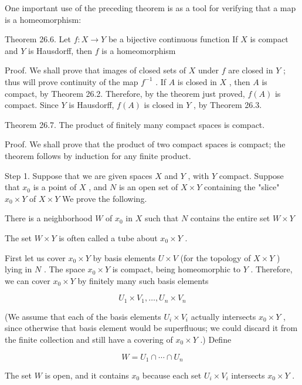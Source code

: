 \documentclass[10pt]{article}
\begin{document}
One important use of the preceding theorem is as a tool for verifying that a map is a homeomorphism:

Theorem 26.6. Let \(f : X \rightarrow  Y\) be a bijective continuous function If \(X\) is compact and \(Y\) is Hausdorff, then \(f\) is a homeomorphism

Proof. We shall prove that images of closed sets of \(X\) under \(f\) are closed in \(Y\) ; thus will prove continuity of the map \({f}^{-1}\) . If \(A\) is closed in \(X\) , then \(A\) is compact, by Theorem 26.2. Therefore, by the theorem just proved, \(f\left( A\right)\) is compact. Since \(Y\) is Hausdorff, \(f\left( A\right)\) is closed in \(Y\) , by Theorem 26.3.

Theorem 26.7. The product of finitely many compact spaces is compact.

Proof. We shall prove that the product of two compact spaces is compact; the theorem follows by induction for any finite product.

Step 1. Suppose that we are given spaces \(X\) and \(Y\) , with \(Y\) compact. Suppose that \({x}_{0}\) is a point of \(X\) , and \(N\) is an open set of \(X \times  Y\) containing the "slice" \({x}_{0} \times  Y\) of \(X \times  Y\) We prove the following.

There is a neighborhood \(W\) of \({x}_{0}\) in \(X\) such that \(N\) contains the entire set \(W \times  Y\)

The set \(W \times  Y\) is often called a tube about \({x}_{0} \times  Y\) .

First let us cover \({x}_{0} \times  Y\) by basis elements \(U \times  V\) (for the topology of \(X \times  Y\) ) lying in \(N\) . The space \({x}_{0} \times  Y\) is compact, being homeomorphic to \(Y\) . Therefore, we can cover \({x}_{0} \times  Y\) by finitely many such basis elements

\[
{U}_{1} \times  {V}_{1},\ldots ,{U}_{n} \times  {V}_{n}
\]

(We assume that each of the basis elements \({U}_{i} \times  {V}_{i}\) actually intersects \({x}_{0} \times  Y\) , since otherwise that basis element would be superfluous; we could discard it from the finite collection and still have a covering of \({x}_{0} \times  Y\) .) Define

\[
W = {U}_{1} \cap  \cdots  \cap  {U}_{n}
\]

The set \(W\) is open, and it contains \({x}_{0}\) because each set \({U}_{i} \times  {V}_{i}\) intersects \({x}_{0} \times  Y\) .
\end{document}
